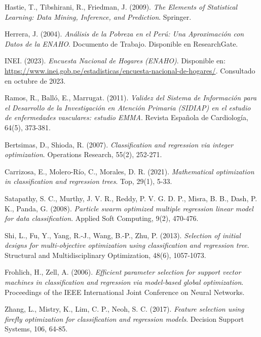 \documentclass{book}
\begin{document}
\begin{thebibliography}{}
	
	Hastie, T., Tibshirani, R., Friedman, J. (2009). 
	\textit{The Elements of Statistical Learning: Data Mining, Inference, and Prediction}. 
	Springer.
	
	Herrera, J. (2004). 
	\textit{Análisis de la Pobreza en el Perú: Una Aproximación con Datos de la ENAHO}. 
	Documento de Trabajo. Disponible en ResearchGate.
	
	INEI. (2023). 
	\textit{Encuesta Nacional de Hogares (ENAHO)}. 
	Disponible en: \url{https://www.inei.gob.pe/estadisticas/encuesta-nacional-de-hogares/}. Consultado en octubre de 2023.
	
	Ramos, R., Balló, E., Marrugat. (2011). 
	\textit{Validez del Sistema de Información para el Desarrollo de la Investigación en Atención Primaria (SIDIAP) en el estudio de enfermedades vasculares: estudio EMMA}. 
	Revista Española de Cardiología, 64(5), 373-381.
	
	Bertsimas, D., Shioda, R. (2007). 
	\textit{Classification and regression via integer optimization}. 
	Operations Research, 55(2), 252-271.
	
	Carrizosa, E., Molero-Río, C., Morales, D. R. (2021). 
	\textit{Mathematical optimization in classification and regression trees}. 
	Top, 29(1), 5-33.
	
	Satapathy, S. C., Murthy, J. V. R., Reddy, P. V. G. D. P., Misra, B. B., Dash, P. K., Panda, G. (2008). 
	\textit{Particle swarm optimized multiple regression linear model for data classification}. 
	Applied Soft Computing, 9(2), 470-476.
	
	Shi, L., Fu, Y., Yang, R.-J., Wang, B.-P., Zhu, P. (2013). 
	\textit{Selection of initial designs for multi-objective optimization using classification and regression tree}. 
	Structural and Multidisciplinary Optimization, 48(6), 1057-1073.
	
	Frohlich, H., Zell, A. (2006). 
	\textit{Efficient parameter selection for support vector machines in classification and regression via model-based global optimization}. 
	Proceedings of the IEEE International Joint Conference on Neural Networks.
	
	Zhang, L., Mistry, K., Lim, C. P., Neoh, S. C. (2017). 
	\textit{Feature selection using firefly optimization for classification and regression models}. 
	Decision Support Systems, 106, 64-85.
	

\end{thebibliography}
\end{document}
